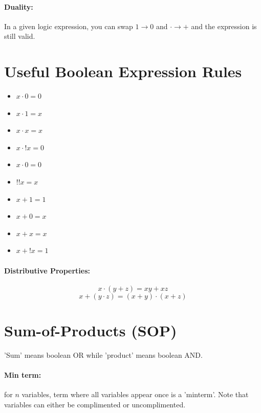 \documentclass[a4paper,12pt]{report}
\begin{document}
\paragraph{Duality: } In a given logic expression, you can swap $1 \to 0$ and $\cdot \to +$
and the expression is still valid.

\section{Useful Boolean Expression Rules}
\begin{itemize}
\item $x \cdot 0 = 0$
\item $x \cdot 1 = x$
\item $x \cdot x = x$
\item $x \cdot !x = 0$
\item $x \cdot 0 = 0$
\item $!!x = x$
\item $x + 1 = 1$
\item $x + 0 = x$
\item $x + x = x$
\item $x + !x = 1$
\end{itemize}

\paragraph{Distributive Properties: }
$$x \cdot (y + z) = xy + xz$$
$$x + (y \cdot z) = (x+y) \cdot (x+z)$$



\section{Sum-of-Products (SOP)}
'Sum' means boolean OR while 'product' means boolean AND. 

\paragraph{Min term: } for $n$ variables, term where all variables appear once is a 'minterm'.
Note that variables can either be complimented or uncomplimented. 
\end{document}
